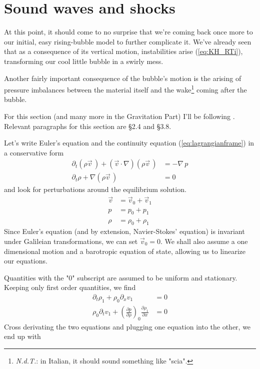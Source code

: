 \section{Sound waves and shocks}
At this point, it should come to no surprise that we're coming back once more to our initial, easy rising-bubble model to further complicate it. We've already seen that as a consequence of its vertical motion, instabilities arise (\ref{eq:KH_RTi}), transforming our cool little bubble in a swirly mess. 
\par Another fairly important consequence of the bubble's motion is the arising of pressure imbalances between the material itself and the wake\footnote{\emph{N.d.T.}: in Italian, it should sound something like "scia".} coming after the bubble.
\par For this section (and many more in the Gravitation Part) I'll be following \cite{Frank_King_Raine_2002}. Relevant paragraphs for this section are §2.4 and §3.8.
\par Let's write Euler's equation and the continuity equation (\ref{eq:lagrangianframe}) in a conservative form 
\begin{align*}
    \partial_{t}(\rho\vec{v}\,) + (\vec{v}\cdot\nabla)(\rho\vec{v}\,) &= -\nabla\, p\\
    \partial_{t}\rho +\nabla(\rho\vec{v}\,) &= 0
\end{align*}
and look for perturbations around the equilibrium solution.
\begin{align*}
    \vec{v} &= \vec{v}_{0} + \vec{v}_{1}\\
    p &= p_{0}+p_{1}\\
    \rho &= \rho_{0}+\rho_{1}
\end{align*}
Since Euler's equation (and by extension, Navier-Stokes' equation) is invariant under Galileian transformations, we can set $\vec{v}_{0} = 0$. We shall also assume a one dimensional motion and a barotropic equation of state, allowing us to linearize our equations.
\par Quantities with the "0" subscript are assumed to be uniform and stationary. Keeping only first order quantities, we find
\begin{align*}
    \partial_{t}\rho_{1}+\rho_{0}\partial_{x}v_{1} &= 0\\
    \rho_{0}\partial_{t}v_{1} +\left(\frac{\partial p}{\partial \rho}\right)_{0}\frac{\partial\rho_{1}}{\partial x} &=0
\end{align*}
Cross derivating the two equations and plugging one equation into the other, we end up with 
